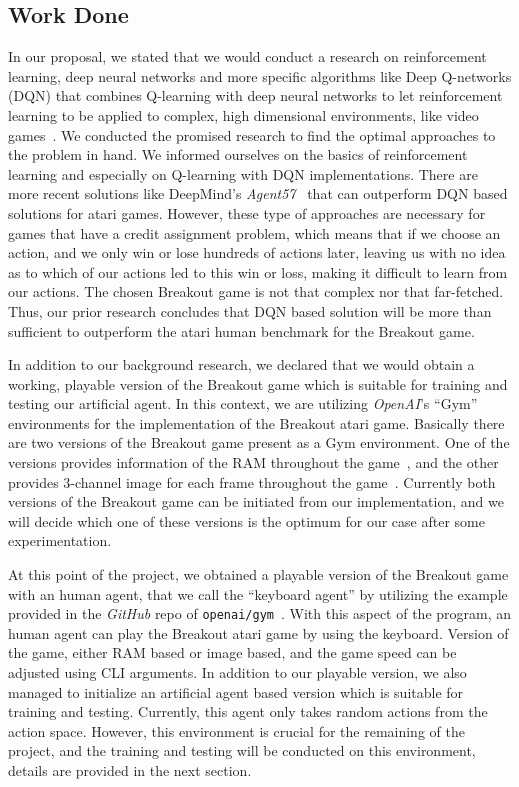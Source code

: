 \subsection{Work Done}
In our proposal, we stated that we would conduct a research on reinforcement learning, deep neural networks and more specific algorithms like Deep Q-networks (DQN) that combines Q-learning with deep neural networks to let reinforcement learning to be  applied to complex, high dimensional environments, like video games~\autocite{openai}. We conducted the promised research to find the optimal approaches to the problem in hand. We informed ourselves on the basics of reinforcement learning and especially on Q-learning with DQN implementations. There are more recent solutions like DeepMind's \textit{Agent57}~\autocite{badia2020agent57} that can outperform DQN based solutions for atari games. However, these type of approaches are necessary for games that have a credit assignment problem, which means that if we choose an action, and we only win or lose hundreds of actions later, leaving us with no idea as to which of our actions led to this win or loss, making it difficult to learn from our actions. The chosen Breakout game is not that complex nor that far-fetched. Thus, our prior research concludes that DQN based solution will be more than sufficient to outperform the atari human benchmark for the Breakout game.

In addition to our background research, we declared that we would obtain a working, playable version of the Breakout game which is suitable for training and testing our artificial agent. In this context, we are utilizing \textit{OpenAI}'s ``Gym'' environments for the implementation of the Breakout atari game. Basically there are two versions of the Breakout game present as a Gym environment. One of the versions provides information of the RAM throughout the game~\autocite{breakout}, and the other provides 3-channel image for each frame throughout the game~\autocite{breakout_image}. Currently both versions of the Breakout game can be initiated from our implementation, and we will decide which one of these versions is the optimum for our case after some experimentation.

At this point of the project, we obtained a playable version of the Breakout game with an human agent, that we call the ``keyboard agent'' by utilizing the example provided in the \textit{GitHub} repo of \texttt{openai/gym}~\autocite{keyboard_agent}. With this aspect of the program, an human agent can play the Breakout atari game by using the keyboard. Version of the game, either RAM based or image based, and the game speed can be adjusted using CLI arguments. In addition to our playable version, we also managed to initialize an artificial agent based version which is suitable for training and testing. Currently, this agent only takes random actions from the action space. However, this environment is crucial for the remaining of the project, and the training and testing will be conducted on this environment, details are provided in the next section.

